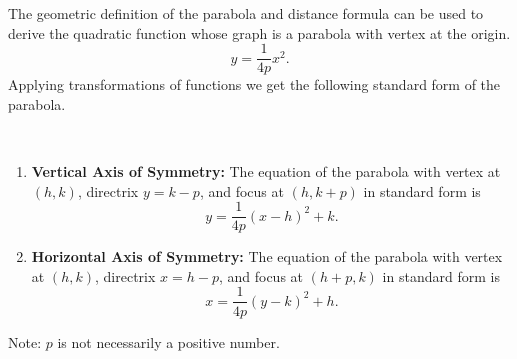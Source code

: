 \iftoggle{abridgeConics}{}{%
The definition leads us to an algebraic formula for the parabola. Let $P=(x,y)$ be a point on a parabola whose focus is at $F=(0,p)$ and whose directrix is at $y=-p$. (We'll assume for now that the focus lies on the $y$-axis; by placing the focus $p$ units above the $x$-axis and the directrix $p$ units below this axis, the vertex will be at $(0,0)$.)

We use the Distance Formula to find the distance $d_1$ between $F$ and $P$:
\[d_1=\sqrt{(x-0)^2+(y-p)^2}.\]
The distance $d_2$ from $P$ to the directrix is more straightforward:
\[d_2=y-(-p) = y+p.\]
These two distances are equal. Setting $d_1=d_2$, we can solve for $y$ in terms of $x$:
\begin{align*}
	d_1&= d_2 \\
	\sqrt{x^2+(y-p)^2} &= y+p 
	\intertext{Now square both sides.}
	x^2+(y-p)^2 &= (y+p)^2 \\
	x^2+y^2-2yp+p^2 &= y^2+2yp+p^2\\
	x^2 &=4yp\\
	y&= \frac{1}{4p}x^2.
\end{align*}%
}
The geometric definition of the parabola and distance formula can be used to derive the quadratic function whose graph is a parabola with vertex at the origin.
\[y=\frac{1}{4p}x^2.\]
Applying transformations of functions we get the following standard form of the parabola.

\begin{keyidea}\label{idea:parabola}
\mbox{}\\[-1.5\baselineskip]\parbox{\linewidth}{%
\begin{enumerate}
	\item	\textbf{Vertical Axis of Symmetry:} The equation of the parabola with vertex at $(h,k)$, directrix $y=k-p$, and focus at $(h,k+p)$ in standard form is \[y=\frac{1}{4p}(x-h)^2+k.\]
	\item	\textbf{Horizontal Axis of Symmetry:} The  equation of the parabola with vertex at $(h,k)$, directrix $x=h-p$, and focus at $(h+p,k)$ in standard form is \[x=\frac{1}{4p}(y-k)^2+h.\]
\end{enumerate}}
Note: $p$ is not necessarily a positive number.
\end{keyidea}

